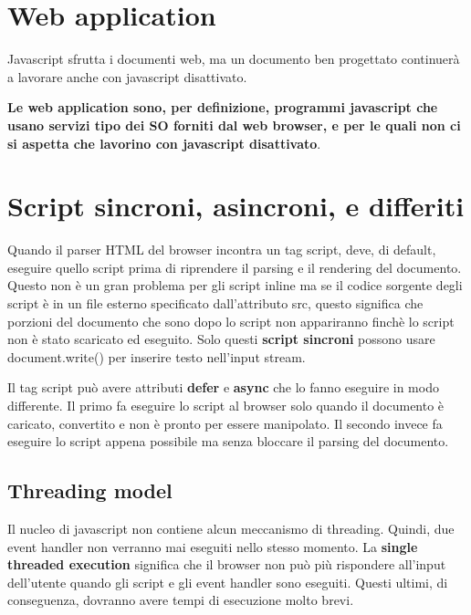 \section{Web application}
Javascript sfrutta i documenti web, ma un documento ben progettato continuerà a lavorare anche con javascript disattivato. 

\textbf{Le web application sono, per definizione, programmi javascript che usano servizi tipo dei SO forniti dal web browser, e per le quali non ci si aspetta che lavorino con javascript disattivato}.

\section{Script sincroni, asincroni, e differiti}
Quando il parser HTML del browser incontra un tag script, deve, di default, eseguire quello script prima di riprendere il parsing e il rendering del documento. Questo non è un gran problema per gli script inline ma se il codice sorgente degli script è in un file esterno specificato dall'attributo src, questo significa che porzioni del documento che sono dopo lo script non appariranno finchè lo script non è stato scaricato ed eseguito. Solo questi \textbf{script sincroni} possono usare document.write() per inserire testo nell'input stream.

Il tag script può avere attributi \textbf{defer} e \textbf{async} che lo fanno eseguire in modo differente. Il primo fa eseguire lo script al browser solo quando il documento è caricato, convertito e non è pronto per essere manipolato. Il secondo invece fa eseguire lo script appena possibile ma senza bloccare il parsing del documento.

\subsection{Threading model}
Il nucleo di javascript non contiene alcun meccanismo di threading. Quindi, due event handler non verranno mai eseguiti nello stesso momento. La \textbf{single threaded execution} significa che il browser non può più rispondere all'input dell'utente quando gli script e  gli event handler sono eseguiti. Questi ultimi, di conseguenza, dovranno avere tempi di esecuzione molto brevi. 

